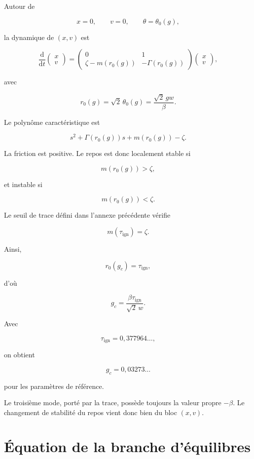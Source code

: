 Autour de

\[
x=0,
\qquad
v=0,
\qquad
\theta=\theta_0(g),
\]

la dynamique de \((x,v)\) est

\[
\frac{\mathrm d}{\mathrm dt}
\begin{pmatrix}
x\\ v
\end{pmatrix}
=
\begin{pmatrix}
0&1\\
\zeta-m(r_0(g))&-\Gamma(r_0(g))
\end{pmatrix}
\begin{pmatrix}
x\\ v
\end{pmatrix},
\]

avec

\[
r_0(g)
=
\sqrt2\,\theta_0(g)
=
\frac{\sqrt2\,gw}{\beta}.
\]

Le polynôme caractéristique est

\[
s^2
+
\Gamma(r_0(g))s
+
m(r_0(g))-\zeta.
\]

La friction est positive. Le repos est donc localement stable si

\[
m(r_0(g))>\zeta,
\]

et instable si

\[
m(r_0(g))<\zeta.
\]

Le seuil de trace défini dans l'annexe précédente vérifie

\[
m(\tau_{\mathrm{ign}})=\zeta.
\]

Ainsi,

\[
r_0(g_c)=\tau_{\mathrm{ign}},
\]

d'où

\[
\boxed{
g_c
=
\frac{\beta\tau_{\mathrm{ign}}}
{\sqrt2\,w}.
}
\]

Avec

\[
\tau_{\mathrm{ign}}
=
0{,}377964\ldots,
\]

on obtient

\[
\boxed{
g_c
=
0{,}03273\ldots
}
\]

pour les paramètres de référence.

Le troisième mode, porté par la trace, possède toujours la valeur
propre \(-\beta\). Le changement de stabilité du repos vient donc bien
du bloc \((x,v)\).

\section{Équation de la branche d'équilibres}
\label{annexe-resistance-residu}

